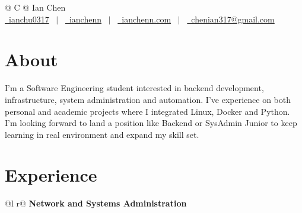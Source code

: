 \documentclass[a4paper,12pt]{article}
\begin{document}
\pagestyle{empty} 



\begin{tabularx}{\linewidth}{@{} C @{}}
\Huge{Ian Chen} \\[7.5pt]
\href{https://github.com/ianchu0317}{\raisebox{-0.05\height}\faGithub\ ianchu0317} \ $|$ \ 
\href{https://linkedin.com/in/ianchenn}{\raisebox{-0.05\height}\faLinkedin\ ianchenn} \ $|$ \ 
\href{https://ianchenn.com}{\raisebox{-0.05\height}\faGlobe \ ianchenn.com} \ $|$ \ 
\href{mailto:chenian317@gmail.com}{\raisebox{-0.05\height}\faEnvelope \ chenian317@gmail.com} \\
\end{tabularx}


\section{About}
I'm a Software Engineering student interested in backend development, infrastructure, system administration and automation. I've experience on both personal and academic projects where I integrated Linux, Docker and Python. I'm looking forward to land a position like Backend or SysAdmin Junior to keep learning in real environment and expand my skill set.


\section{Experience}

\begin{tabularx}{\linewidth}{ @{}l r@{} }
\textbf{Network and Systems Administration} \\[3.75pt]
  \\
\end{tabularx}
\end{document}

